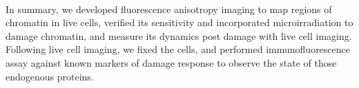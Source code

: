 \paragraph*{} In summary, we developed fluorescence anisotropy imaging to map regions of chromatin in live cells, verified its sensitivity and incorporated microirradiation to damage chromatin, and measure its dynamics post damage with live cell imaging. Following live cell imaging, we fixed the cells, and performed immunofluorescence assay against known markers of damage response to observe the state of those endogenous proteins.
